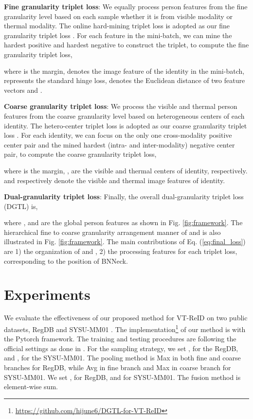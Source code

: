 \documentclass[journal]{IEEEtran}
\begin{document}
\textbf{Fine granularity triplet loss}: We equally process person features from the fine granularity level based on each sample whether it is from visible modality or thermal modality. The online hard-mining triplet loss \cite{hermans2017defense} is adopted as our fine granularity triplet loss . For each feature  in the mini-batch, we can mine the hardest positive  and hardest negative  to construct the triplet, to compute the fine granularity triplet loss,

where  is the margin,  denotes the  image feature of the  identity in the mini-batch,  represents the standard hinge loss,  denotes the Euclidean distance of two feature vectors  and .

\textbf{Coarse granularity triplet loss}: We process the visible and thermal person features from the coarse granularity level based on heterogeneous centers of each identity. The hetero-center triplet loss \cite{Liu2020ParametersSE} is adopted as our coarse granularity triplet loss . For each identity, we can focus on the only one cross-modality positive center pair and the mined hardest (intra- and inter-modality) negative center pair, to compute the coarse granularity triplet loss,
\begin{small}

\end{small}
where  is the margin, ,  are the visible and thermal centers of  identity, respectively.  and  respectively denote the  visible and thermal image features of  identity.


\textbf{Dual-granularity triplet loss}: Finally, the overall dual-granularity triplet loss (DGTL) is,

where ,  and  are the global person features as shown in Fig. \ref{fig:framework}. The hierarchical fine to coarse granularity arrangement manner of  and  is also illustrated in Fig. \ref{fig:framework}. The main contributions of Eq. (\ref{eq:final_loss}) are 1) the organization of  and , 2) the processing features for each triplet loss, corresponding to the position of BNNeck.

\section{Experiments}
We evaluate the effectiveness of our proposed method for VT-ReID on two public datasets, RegDB \cite{nguyen2017person} and  SYSU-MM01 \cite{wu2017rgb}.
The implementation\footnote{\url{https://github.com/hijune6/DGTL-for-VT-ReID}} of our method is with the Pytorch framework. The training and testing procedures are following the official settings as done in \cite{Ye2020DeepLF,Liu2020ParametersSE}.
For the  sampling strategy, we set ,  for the RegDB, and ,  for the SYSU-MM01.
The pooling method is Max in both fine and coarse branches for RegDB, while Avg in fine branch and Max in coarse branch for SYSU-MM01.
We set ,  for RegDB, and  for SYSU-MM01.
The fusion method is element-wise sum.
\end{document}
